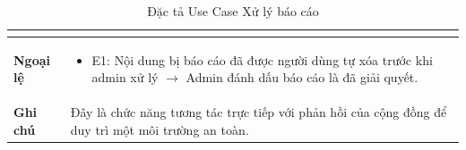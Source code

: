 \begin{table}[H]
\begin{tabularx}{\textwidth}{|l|X|}
\begin{itemize}
\end{itemize} \\ \hline
\textbf{Ngoại lệ} & 
\begin{itemize}
    \item E1: Nội dung bị báo cáo đã được người dùng tự xóa trước khi admin xử lý $\rightarrow$ Admin đánh dấu báo cáo là đã giải quyết.
\end{itemize} \\ \hline
\textbf{Ghi chú} & Đây là chức năng tương tác trực tiếp với phản hồi của cộng đồng để duy trì một môi trường an toàn. \\ \hline
\end{tabularx}
\caption{Đặc tả Use Case Xử lý báo cáo}
\end{table}

